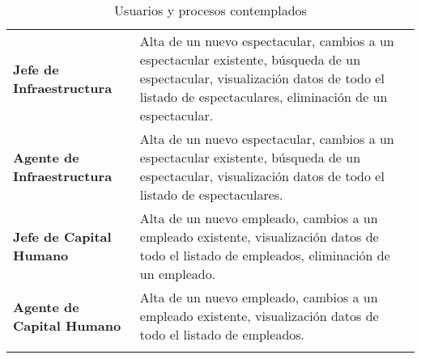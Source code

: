 \begin{longtable}[H]{m{4cm}m{8cm}}
    \textbf{Jefe de Infraestructura} & Alta de un nuevo espectacular, cambios a un espectacular existente, búsqueda de un espectacular, visualización datos de todo el listado de espectaculares, eliminación de un espectacular.\tabularnewline
    \textbf{Agente de Infraestructura} & Alta de un nuevo espectacular, cambios a un espectacular existente, búsqueda de un espectacular, visualización datos de todo el listado de espectaculares.\tabularnewline
    \textbf{Jefe de Capital Humano} & Alta de un nuevo empleado, cambios a un empleado existente, visualización datos de todo el listado de empleados, eliminación de un empleado.\tabularnewline
    \textbf{Agente de Capital Humano} & Alta de un nuevo empleado, cambios a un empleado existente, visualización datos de todo el listado de empleados. \tabularnewline

\caption{Usuarios y procesos contemplados}
\label{tbl:listaUP}
\bottomrule
\end{longtable}
